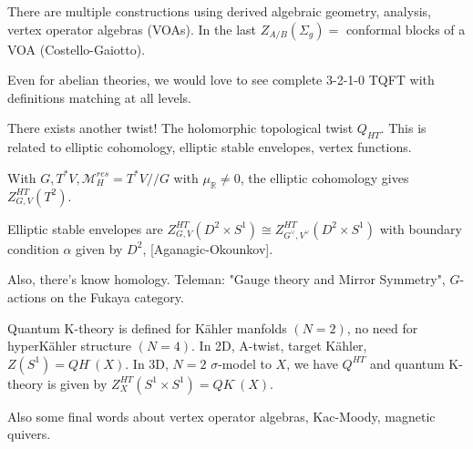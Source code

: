 There are multiple constructions using derived algebraic geometry, analysis, vertex operator algebras (VOAs). In the last $Z_{A/B}(\Sigma_g) = $ conformal blocks of a VOA (Costello-Gaiotto). 

Even for abelian theories, we would love to see complete 3-2-1-0 TQFT with definitions matching at all levels.

There exists another twist! The holomorphic topological twist $Q_{HT}.$ This is related to elliptic cohomology, elliptic stable envelopes, vertex functions.

With $G, T^* V, \mathcal{M}_H^{res} = T^*V//G$ with $\mu_{\mathbb{R}} \neq 0$, the elliptic cohomology gives $Z_{G, V}^{HT}(T^2).$

Elliptic stable envelopes are $Z_{G,V}^{HT}(D^2 \times S^1) \cong Z_{G^{\vee}, V^{\vee}}^{HT}(D^2 \times S^1)$ with boundary condition $\alpha$ given by $D^2$, [Aganagic-Okounkov].

Also, there's know homology. Teleman: "Gauge theory and Mirror Symmetry", $G$-actions on the Fukaya category.

Quantum K-theory is defined for K\"ahler manfolds $(N=2)$, no need for hyperK\"ahler structure $(N=4).$ In 2D, A-twist, target K\"ahler, $Z(S^1) = QH^{\cdot}(X).$ In 3D, $N=2$ $\sigma$-model to $X$, we have $Q^{HT}$ and quantum K-theory is given by $Z_X^{HT}(S^1 \times S^1) = QK^{\cdot}(X).$

Also some final words about vertex operator algebras, Kac-Moody, magnetic quivers.

